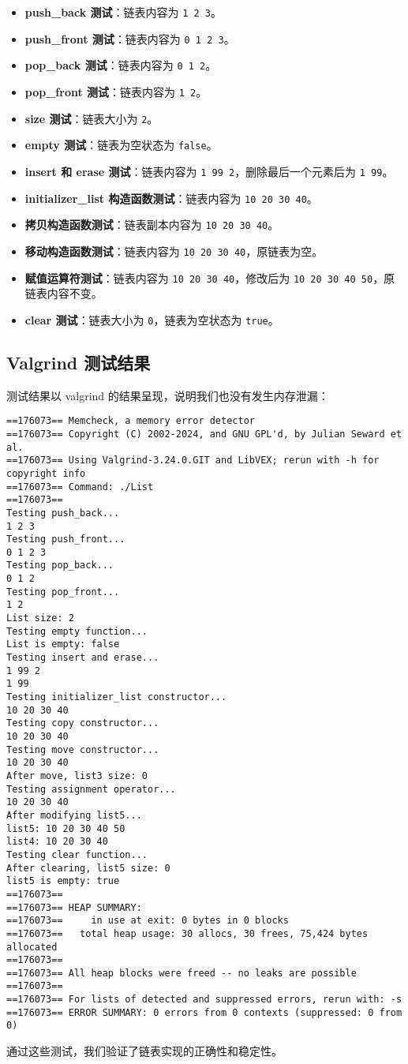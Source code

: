 \documentclass[UTF8]{ctexart}
\begin{document}
\begin{itemize}
  \item \textbf{push\_back 测试}：链表内容为 \texttt{1 2 3}。
  \item \textbf{push\_front 测试}：链表内容为 \texttt{0 1 2 3}。
  \item \textbf{pop\_back 测试}：链表内容为 \texttt{0 1 2}。
  \item \textbf{pop\_front 测试}：链表内容为 \texttt{1 2}。
  \item \textbf{size 测试}：链表大小为 \texttt{2}。
  \item \textbf{empty 测试}：链表为空状态为 \texttt{false}。
  \item \textbf{insert 和 erase 测试}：链表内容为 \texttt{1 99 2}，删除最后一个元素后为 \texttt{1 99}。
  \item \textbf{initializer\_list 构造函数测试}：链表内容为 \texttt{10 20 30 40}。
  \item \textbf{拷贝构造函数测试}：链表副本内容为 \texttt{10 20 30 40}。
  \item \textbf{移动构造函数测试}：链表内容为 \texttt{10 20 30 40}，原链表为空。
  \item \textbf{赋值运算符测试}：链表内容为 \texttt{10 20 30 40}，修改后为 \texttt{10 20 30 40 50}，原链表内容不变。
  \item \textbf{clear 测试}：链表大小为 \texttt{0}，链表为空状态为 \texttt{true}。
\end{itemize}

\subsection{Valgrind 测试结果}

测试结果以 valgrind 的结果呈现，说明我们也没有发生内存泄漏：

\begin{verbatim}
==176073== Memcheck, a memory error detector
==176073== Copyright (C) 2002-2024, and GNU GPL'd, by Julian Seward et al.
==176073== Using Valgrind-3.24.0.GIT and LibVEX; rerun with -h for copyright info
==176073== Command: ./List
==176073== 
Testing push_back...
1 2 3 
Testing push_front...
0 1 2 3 
Testing pop_back...
0 1 2 
Testing pop_front...
1 2 
List size: 2
Testing empty function...
List is empty: false
Testing insert and erase...
1 99 2 
1 99 
Testing initializer_list constructor...
10 20 30 40 
Testing copy constructor...
10 20 30 40 
Testing move constructor...
10 20 30 40 
After move, list3 size: 0
Testing assignment operator...
10 20 30 40 
After modifying list5...
list5: 10 20 30 40 50 
list4: 10 20 30 40 
Testing clear function...
After clearing, list5 size: 0
list5 is empty: true
==176073== 
==176073== HEAP SUMMARY:
==176073==     in use at exit: 0 bytes in 0 blocks
==176073==   total heap usage: 30 allocs, 30 frees, 75,424 bytes allocated
==176073== 
==176073== All heap blocks were freed -- no leaks are possible
==176073== 
==176073== For lists of detected and suppressed errors, rerun with: -s
==176073== ERROR SUMMARY: 0 errors from 0 contexts (suppressed: 0 from 0)
\end{verbatim}

通过这些测试，我们验证了链表实现的正确性和稳定性。
\end{document}
